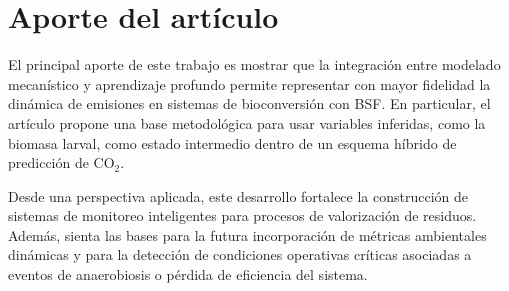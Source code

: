 \section{Aporte del artículo}

El principal aporte de este trabajo es mostrar que la integración entre modelado mecanístico y aprendizaje profundo permite representar con mayor fidelidad la dinámica de emisiones en sistemas de bioconversión con BSF. En particular, el artículo propone una base metodológica para usar variables inferidas, como la biomasa larval, como estado intermedio dentro de un esquema híbrido de predicción de CO$_2$.

Desde una perspectiva aplicada, este desarrollo fortalece la construcción de sistemas de monitoreo inteligentes para procesos de valorización de residuos. Además, sienta las bases para la futura incorporación de métricas ambientales dinámicas y para la detección de condiciones operativas críticas asociadas a eventos de anaerobiosis o pérdida de eficiencia del sistema.
